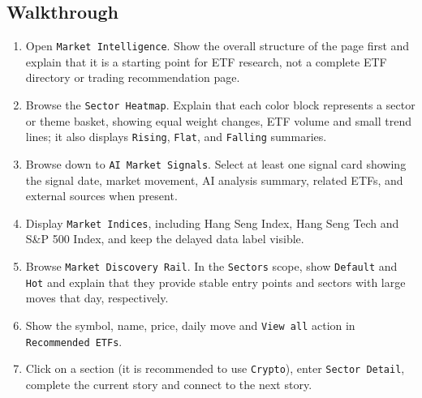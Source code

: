 \subsection{Walkthrough}
\begin{enumerate}
\item Open \texttt{Market Intelligence}. Show the overall structure of the page first and explain that it is a starting point for ETF research, not a complete ETF directory or trading recommendation page.
\item Browse the \texttt{Sector Heatmap}. Explain that each color block represents a sector or theme basket, showing equal weight changes, ETF volume and small trend lines; it also displays \texttt{Rising}, \texttt{Flat}, and \texttt{Falling} summaries.
\item Browse down to \texttt{AI Market Signals}. Select at least one signal card showing the signal date, market movement, AI analysis summary, related ETFs, and external sources when present.
\item Display \texttt{Market Indices}, including Hang Seng Index, Hang Seng Tech and S\&P 500 Index, and keep the delayed data label visible.
\item Browse \texttt{Market Discovery Rail}. In the \texttt{Sectors} scope, show \texttt{Default} and \texttt{Hot} and explain that they provide stable entry points and sectors with large moves that day, respectively.
\item Show the symbol, name, price, daily move and \texttt{View all} action in \texttt{Recommended ETFs}.
\item Click on a section (it is recommended to use \texttt{Crypto}), enter \texttt{Sector Detail}, complete the current story and connect to the next story.
\end{enumerate}
